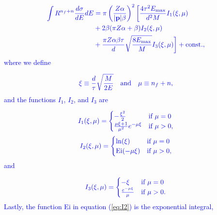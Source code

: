 \documentclass[twoside,twocolumn,9pt]{article}
\begin{document}
\begin{equation}
\textcolor{blue}{
  \begin{aligned}
    \int R^{n_f+n} \frac{d\sigma}{dE} dE
    &=
    \pi\left(\frac{Z\alpha}{|\mathbf{p}|\beta}\right)^2
    \bigg[
      \frac{4\tau^2 E_\text{max}}{d^2M}
      I_1(\xi, \mu)
      \\&+
      2\beta(\pi Z\alpha+\beta)
      I_2(\xi, \mu)
      \\&+
      \frac{\pi Z\alpha\beta\tau}{d}\sqrt{\frac{8E_\text{max}}{M}}
      I_3(\xi, \mu)
    \bigg]
    +\text{const}.,
  \end{aligned}
  \label{eq:analytical}
}
\end{equation}
%
\textcolor{blue}{
where we define
}

\begin{equation}
\textcolor{blue}{
  \xi \equiv \frac{d}{\tau} \sqrt{\frac{M}{2E}}
  \quad\text{and}\quad
  \mu \equiv n_f + n,
  \label{eq:xi}
}
\end{equation}
%
\textcolor{blue}{
and the functions $I_1$, $I_2$, and $I_3$ are
}

\begin{equation}
\textcolor{blue}{
  I_1(\xi, \mu)
  =
  \begin{cases}
    -\frac{\xi^2}{2} &\text{if } \mu=0\\
    \frac{\mu\xi+1}{\mu^2} e^{-\mu\xi}  &\text{if } \mu>0,
  \end{cases}
  \label{eq:I1}
}
\end{equation}
%
\begin{equation}
\textcolor{blue}{
  I_2(\xi, \mu)
  =
  \begin{cases}
    \ln(\xi) &\text{if } \mu=0\\
    \text{Ei}(-\mu\xi) &\text{if } \mu>0,
  \end{cases}
  \label{eq:I2}
}
\end{equation}
%
\textcolor{blue}{
and 
}

\begin{equation}
\textcolor{blue}{
  I_3(\xi, \mu)
  =
  \begin{cases}
    -\xi &\text{if } \mu=0\\
    \frac{e^{-\mu\xi}}{\mu}  &\text{if } \mu>0.
  \end{cases}
  \label{eq:I3}
}
\end{equation}
%
\textcolor{blue}{
Lastly, the function Ei in equation (\ref{eq:I2}) is the exponential integral,
}
\end{document}
